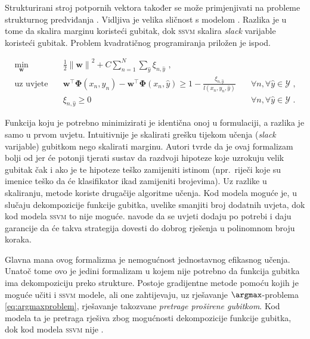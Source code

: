 Strukturirani stroj potpornih vektora  također se može primjenjivati na probleme strukturnog predviđanja
\citep{tsochantaridis2005large}. Vidljiva je velika sličnost s modelom \mmmm{}.
Razlika je u tome da \mmmm{} skalira marginu koristeći gubitak, dok
\textsc{ssvm} skalira \textit{slack} varijable koristeći gubitak. Problem
kvadratičnog programiranja priložen je ispod.

\begin{equation}\label{eq:ssvm}
\begin{aligned}
  \min_{\mathbf{w}} & \quad \frac{1}{2} {\lVert\mathbf{w}\lVert}^2 + C \sum_{n=1}^{N}\sum_{\hat{y}} \xi_{n,\hat{y}} \text{ ,}              & \\
  \text{uz uvjete}  & \quad \mathbf{w}^\top \mathbf{\Phi}(x_n, y_n) - \mathbf{w}^\top \mathbf{\Phi}(x_n, \hat{y}) \ge 1 - \frac{\xi_{n,\hat{y}}}{l(x_n, y_n, \hat{y})} & \quad \forall n, \forall \hat{y} \in \mathcal{Y} \text{ ,}\\
                    & \quad \xi_{n,\hat{y}} \ge 0                                                                                          & \quad \forall n, \forall \hat{y} \in \mathcal{Y} \text{ .}
\end{aligned}
\end{equation}

\noindent
Funkcija koju je potrebno minimizirati je identična onoj u \mmmm{} formulaciji, a
razlika je samo u prvom uvjetu. Intuitivnije je skalirati grešku tijekom učenja
(\textit{slack} varijable) gubitkom nego skalirati marginu. Autori tvrde da je
ovaj formalizam bolji od \mmmm{} jer će potonji tjerati sustav da razdvoji
hipoteze koje uzrokuju velik gubitak čak i ako je te hipoteze teško zamijeniti
istinom (npr.~riječi koje su imenice teško da će klasifikator ikad zamijeniti
brojevima). Uz razlike u skaliranju, metode koriste drugačije algoritme učenja.
Kod \mmmm{} modela moguće je, u slučaju dekompozicije funkcije gubitka, uvelike
smanjiti broj dodatnih uvjeta, dok kod modela \textsc{ssvm} to nije moguće.
\citet{tsochantaridis2005large} navode da se uvjeti dodaju po potrebi i daju
garancije da će takva strategija dovesti do dobrog rješenja u polinomnom broju
koraka.

Glavna mana ovog formalizma je nemogućnost jednostavnog efikasnog učenja. Unatoč
tome ovo je jedini formalizam u kojem nije potrebno da funkcija gubitka ima
dekompoziciju preko strukture. Postoje gradijentne metode pomoću kojih je moguće
učiti \mmmm{} i \textsc{ssvm} modele, ali one zahtijevaju, uz rješavanje
$\argmax$-problema \ref{eq:argmaxproblem}, rješavanje takozvane \textit{pretrage
proširene gubitkom}. Kod \mmmm{} modela ta je pretraga rješiva zbog mogućnosti
dekompozicije funkcije gubitka, dok kod modela \textsc{ssvm} nije
\citep{ratliff2006maximum}.
